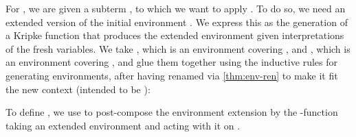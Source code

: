 
For , we are given a subterm , to
which we want to apply .  To do so, we need an
extended version of the initial environment \AgdaBound{$\rho$}. We
express this as the generation of a Kripke function that produces the
extended environment given interpretations of the fresh variables. We
take \AgdaBound{$\rho$}, which is an environment covering
\AgdaBound{$\Delta$}, and \AgdaBound{$\sigma$}, which is an
environment covering \AgdaBound{$\Theta$}, and glue them together
using the inductive rules for generating environments, after having
renamed \AgdaBound{$\rho$} via \cref{thm:env-ren} to make it fit the
new context \AgdaBound{$\Gamma^+$} (intended to be
):


To define , we use  to
post-compose the environment extension by the
\AgdaSymbol{$\lambda$}-function taking an extended environment and
acting with it on .


